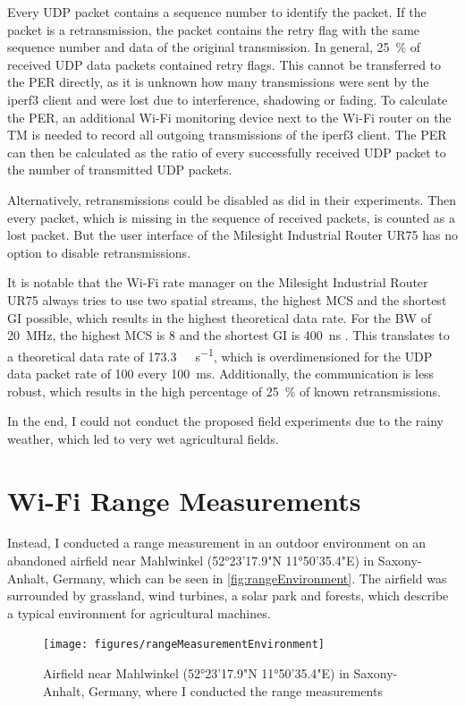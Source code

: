 Every \ac{UDP} packet contains a sequence number to identify the packet.
If the packet is a retransmission, the packet contains the retry flag
with the same sequence number and data of the original transmission.
In general, \SI{25}{\percent} of received \ac{UDP} data packets contained retry flags.
This cannot be transferred to the \ac{PER} directly,
as it is unknown how many transmissions were sent by the iperf3 client and were lost due to interference, shadowing or fading.
To calculate the \ac{PER}, an additional Wi-Fi monitoring device next to the Wi-Fi router on the \ac{TM} is needed to record all
outgoing transmissions of the iperf3 client.
The \ac{PER} can then be calculated as the ratio of every successfully received \ac{UDP} packet to the number of transmitted \ac{UDP} packets.

Alternatively, retransmissions could be disabled as \textcite{klingler_agriculture_2018} did in their experiments.
Then every packet, which is missing in the sequence of received packets, is counted as a lost packet.
But the user interface of the Milesight Industrial Router UR75 has no option to disable retransmissions.

It is notable that the Wi-Fi rate manager on the Milesight Industrial Router UR75 always tries to use two spatial streams, the highest \ac{MCS} and the shortest \ac{GI} possible,
which results in the highest theoretical data rate.
For the \ac{BW} of \SI{20}{\mega\hertz}, the highest \ac{MCS} is \num{8} and the shortest \ac{GI} is \SI{400}{\nano\second} \cite{ieee_standard_2020}.
This translates to a theoretical data rate of \SI{173.3}{\mega\bit\per\second}, which is overdimensioned for the \ac{UDP} data packet rate of \SI{100}{\byte}
every \SI{100}{\milli\second}.
Additionally, the communication is less robust, which results in the high percentage of \SI{25}{\percent} of known retransmissions.

In the end, I could not conduct the proposed field experiments due to the rainy weather, which led to very wet agricultural fields.

\section{Wi-Fi Range Measurements}
Instead, I conducted a range measurement in an outdoor environment on an abandoned airfield near Mahlwinkel (52°23'17.9"N 11°50'35.4"E) in Saxony-Anhalt, Germany,
which can be seen in \autoref{fig:rangeEnvironment}.
The airfield was surrounded by grassland, wind turbines, a solar park and forests, which describe a typical environment for agricultural machines.
\begin{figure}[H]%
   \centering
   \texttt{[image: figures/rangeMeasurementEnvironment]}
   \caption{Airfield near Mahlwinkel (52°23'17.9"N 11°50'35.4"E) in Saxony-Anhalt, Germany, where I conducted the range measurements}
   \label{fig:rangeEnvironment}%
\end{figure}

